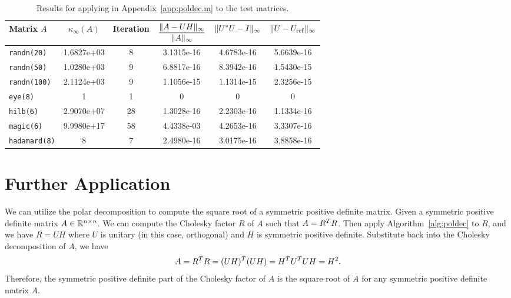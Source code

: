 \documentclass[12pt]{article}
\begin{document}
\begin{table}[H]
    \centering 
    \caption{Results for applying  in Appendix~\ref{app:poldec.m} to the test matrices.}
    \label{tab:numerical-data}
    \begin{tabular}{lccccc}
        \toprule 
            {Matrix $A$} & {\(\displaystyle \kappa_\infty(A)\)} & {Iteration} & {\(\displaystyle \frac{\|{A - UH}\|_\infty}{\|{A}\|_\infty}\)} & {\(\displaystyle \|{U^* U - I}\|_{\infty}\)} & {$\|{U - U_{\mathrm{ref}}}\|_{\infty}$}\\
        \toprule 
        \texttt{randn(20)} & 1.6827e+03 & 8 & 3.1315e-16 & 4.6783e-16 & 5.6639e-16 \\
        \midrule 
        \texttt{randn(50)} & 1.0280e+03 & 9 & 6.8817e-16 & 8.3942e-16 & 1.5430e-15\\
        \midrule 
        \texttt{randn(100)} & 2.1124e+03 & 9 & 1.1056e-15 & 1.1314e-15 & 2.3256e-15\\
        \midrule 
        \texttt{eye(8)} & 1 & 1 & 0 & 0 & 0\\
        \midrule 
        \texttt{hilb(6)} & 2.9070e+07 & 28 & 1.3028e-16 & 2.2303e-16 & 1.1334e-16  \\
        \midrule 
        \texttt{magic(6)} & 9.9980e+17 & 58 & 4.4338e-03 & 4.2653e-16 & 3.3307e-16\\
        \midrule 
        \texttt{hadamard(8)} & 8 & 7 & 2.4980e-16 & 3.0175e-16 & 3.8858e-16\\
        \bottomrule
    \end{tabular}
\end{table}

\section{Further Application}
We can utilize the polar decomposition to compute the square root of a symmetric positive definite matrix. Given a symmetric positive definite matrix $A\in\mathbb{R}^{n\times n}$. We can compute the Cholesky factor $R$ of $A$ such that $A = R^T R$. Then apply Algorithm~\ref{alg:poldec} to $R$, and we have $R = UH$ where $U$ is unitary (in this case, orthogonal) and $H$ is symmetric positive definite. Substitute back into the Cholesky decomposition of $A$, we have 
\begin{equation}
    \notag 
    A = R^T R = (UH)^T (UH) = H^T U^T U H = H^2.
\end{equation}
Therefore, the symmetric positive definite part of the Cholesky factor of $A$ is the square root of $A$ for any symmetric positive definite matrix $A$.
\end{document}
